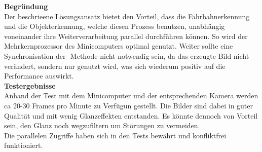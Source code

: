 \textbf{Begründung}\\[0.2cm]
Der beschrieene Lösungsansatz bietet den Vorteil, dass die Fahrbahnerkennung und die Objekterkennung, welche diesen Prozess benutzen, unabhängig voneinander ihre Weiterverarbeitung parallel durchführen können. So wird der Mehrkernprozessor des Minicomputers optimal genutzt. Weiter  sollte eine Synchronisation der -Methode nicht notwendig sein, da das erzeugte Bild nicht verändert, sondern nur genutzt wird, was sich wiederum positiv auf die Performance auswirkt.\\[0.2cm]
\textbf{Testergebnisse}\\[0.2cm]
Anhand der Test mit dem Minicomputer und der entsprechenden Kamera werden ca 20-30 Frames pro Minute zu Verfügun gestellt. Die Bilder sind dabei in guter Qualität und mit wenig Glanzeffekten entstanden. Es könnte dennoch von Vorteil sein, den Glanz noch wegzufiltern um Störungen zu vermeiden.\\
Die parallelen Zugriffe haben sich in den Tests bewährt und konfliktfrei funktioniert.